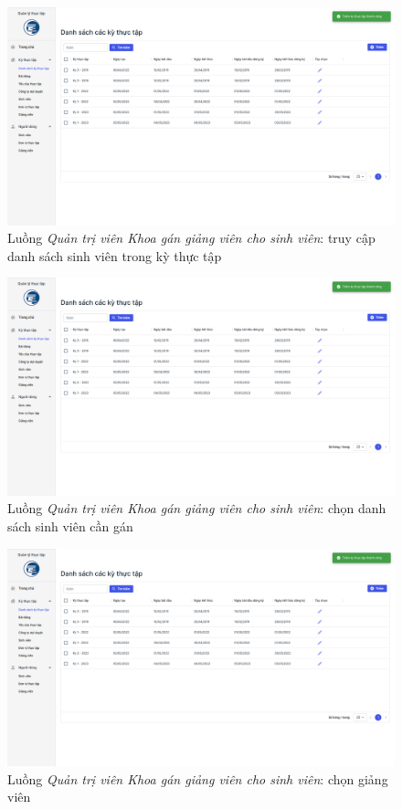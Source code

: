 \documentclass[./../main.tex]{subfiles}
\begin{document}
\begin{figure}[]
	\includegraphics[width=\linewidth]{./images/image55.png} %
	\caption{Luồng \emph{Quản trị viên Khoa gán giảng viên cho sinh viên}: truy cập danh sách sinh viên trong kỳ thực tập}
	\label{fig:org_admin_access_list_intern_students_1}
\end{figure}

\begin{figure}[]
	\includegraphics[width=\linewidth]{./images/image55.png} %
	\caption{Luồng \emph{Quản trị viên Khoa gán giảng viên cho sinh viên}: chọn danh sách sinh viên cần gán}
	\label{fig:org_admin_select_students}
\end{figure}

\begin{figure}[]
	\includegraphics[width=\linewidth]{./images/image55.png} %
	\caption{Luồng \emph{Quản trị viên Khoa gán giảng viên cho sinh viên}: chọn giảng viên}
	\label{fig:org_admin_select_lecturer}
\end{figure}
\end{document}
